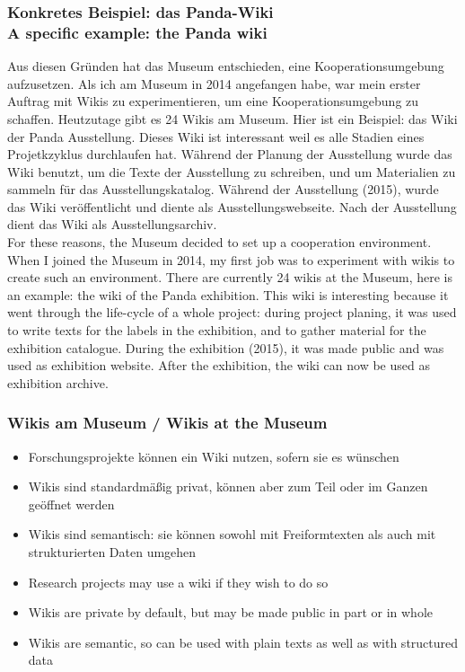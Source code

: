 \documentclass[12pt]{beamer}
\begin{document}
{\scriptsize
\begin{frame}
  \frametitle{Konkretes Beispiel: das Panda-Wiki\\\textcolor{mfn_green}{A specific example: the Panda wiki}}
  Aus diesen Gründen hat das Museum entschieden, eine Kooperationsumgebung aufzusetzen. Als ich am Museum in 2014 angefangen habe, war mein erster Auftrag mit Wikis zu experimentieren, um eine Kooperationsumgebung zu schaffen. Heutzutage gibt es 24 Wikis am Museum. Hier ist ein Beispiel: das Wiki der Panda Ausstellung. Dieses Wiki ist interessant weil es alle Stadien eines Projetkzyklus durchlaufen hat. Während der Planung der Ausstellung wurde das Wiki benutzt, um die Texte der Ausstellung zu schreiben, und um Materialien zu sammeln für das Ausstellungskatalog. Während der Ausstellung (2015), wurde das Wiki veröffentlicht und diente als Ausstellungswebseite. Nach der Ausstellung dient das Wiki als Ausstellungsarchiv. \\
  \bigskip
  \textcolor{mfn_green}{For these reasons, the Museum decided to set up a cooperation environment. When I joined the Museum in 2014, my first job was to experiment with wikis to create such an environment. There are currently 24 wikis at the Museum, here is an example: the wiki of the Panda exhibition. This wiki is interesting because it went through the life-cycle of a whole project: during project planing, it was used to write texts for the labels in the exhibition, and to gather material for the exhibition catalogue. During the exhibition (2015), it was made public and was used as exhibition website. After the exhibition, the wiki can now be used as exhibition archive.}
\end{frame}
}
\begin{frame}
  \frametitle{Wikis am Museum / \textcolor{mfn_green}{Wikis at the Museum}}

  \begin{itemize}
  \item{Forschungsprojekte können ein Wiki nutzen, sofern sie es wünschen}
  \item{Wikis sind standardmäßig privat, können aber zum Teil oder im Ganzen geöffnet werden}
  \item{Wikis sind semantisch: sie können sowohl mit Freiformtexten als auch mit strukturierten Daten umgehen}
  \end{itemize}
  
  \begin{itemize}
  \item{\textcolor{mfn_green}{Research projects may use a wiki if they wish to do so}}
  \item{\textcolor{mfn_green}{Wikis are private by default, but may be made public in part or in whole}}
  \item{\textcolor{mfn_green}{Wikis are semantic, so can be used with plain texts as well as with structured data}}
  \end{itemize}
\end{frame}
\end{document}
